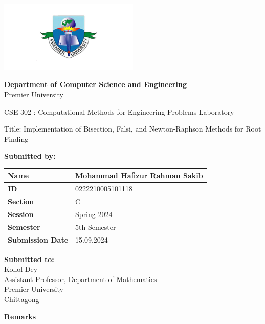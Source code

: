 \documentclass{scrreprt}
\renewcommand{\arraystretch}{1.5}
\begin{document}
\begin{titlepage}
    \centering
    \includegraphics[width=0.5\textwidth]{./logo.png} 
    \vspace{1cm}

    \textbf{Department of Computer Science and Engineering}\\
    Premier University
    \vspace{1cm}

     \Large \textnormal{CSE 302 : Computational Methods for Engineering 
    Problems Laboratory }
    \vspace{1in} 

    \Large \textnormal{Title: Implementation of Bisection, Falsi, and Newton-Raphson Methods for Root Finding}
    \vspace{0.5in} 

    \large
    \textbf{Submitted by:}
    \vspace{0.5cm}

    \renewcommand{\arraystretch}{1.5} 
    \begin{tabular}{|p{}|p{}|}
        \hline
        \textbf{Name} & Mohammad Hafizur Rahman Sakib \\ 
        \hline
        \textbf{ID} & 0222210005101118 \\ 
        \hline
        \textbf{Section} & C \\ 
        \hline
        \textbf{Session} & Spring 2024 \\ 
        \hline
        \textbf{Semester} & 5th Semester \\ 
        \hline
        \textbf{Submission Date} & 15.09.2024 \\ 
        \hline
    \end{tabular}
    \vspace{1cm}

    \begin{minipage}[t]{0.48\textwidth}
        \textbf{Submitted to:}\\
        Kollol Dey\\
        Assistant Professor, Department of Mathematics\\
        Premier University\\
        Chittagong
    \end{minipage}%
    \hfill 
    \begin{minipage}[t]{0.48\textwidth}
        \raggedleft
        \textbf{Remarks}\\
        \vspace{0.5cm} %
    \end{minipage}


\end{titlepage}
\end{document}
